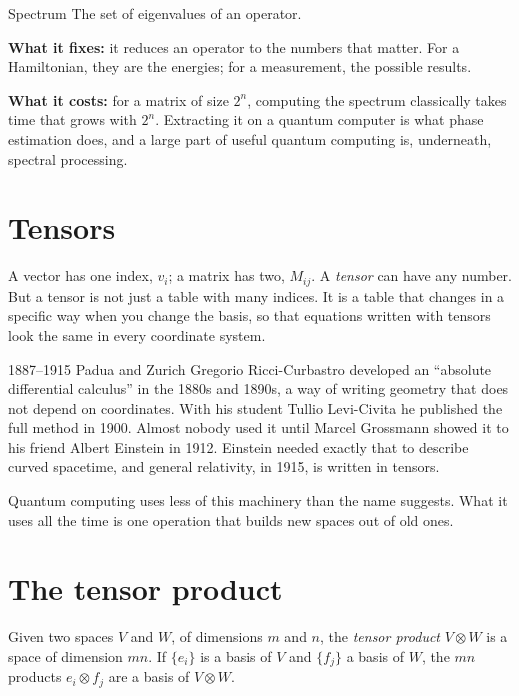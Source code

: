 \begin{concept}{Spectrum}
The set of eigenvalues of an operator.

\textbf{What it fixes:} it reduces an operator to the numbers that matter. For a
Hamiltonian, they are the energies; for a measurement, the possible results.

\textbf{What it costs:} for a matrix of size $2^n$, computing the spectrum
classically takes time that grows with $2^n$. Extracting it on a quantum computer
is what phase estimation does, and a large part of useful quantum computing is,
underneath, spectral processing.
\end{concept}

\section{Tensors}

A vector has one index, $v_i$; a matrix has two, $M_{ij}$. A \emph{tensor} can
have any number. But a tensor is not just a table with many indices. It is a table
that changes in a specific way when you change the basis, so that equations
written with tensors look the same in every coordinate system.

\begin{history}{1887--1915 \textperiodcentered{} Padua and Zurich}
Gregorio Ricci-Curbastro developed an ``absolute differential calculus'' in the
1880s and 1890s, a way of writing geometry that does not depend on coordinates.
With his student Tullio Levi-Civita he published the full method in 1900. Almost
nobody used it until Marcel Grossmann showed it to his friend Albert Einstein in
1912. Einstein needed exactly that to describe curved spacetime, and general
relativity, in 1915, is written in tensors.
\end{history}

Quantum computing uses less of this machinery than the name suggests. What it
uses all the time is one operation that builds new spaces out of old ones.

\section{The tensor product}

Given two spaces $V$ and $W$, of dimensions $m$ and $n$, the \emph{tensor product}
$V \otimes W$ is a space of dimension $mn$. If $\{e_i\}$ is a basis of $V$ and
$\{f_j\}$ a basis of $W$, the $mn$ products $e_i \otimes f_j$ are a basis of
$V \otimes W$.

